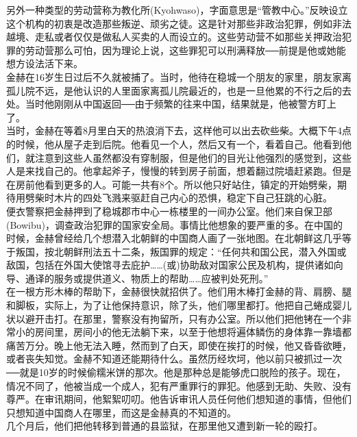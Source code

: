 另外一种类型的劳动营称为教化所(Kyohwaso)，字面意思是“管教中心。”反映设立这个机构的初衷是改造那些叛逆、顽劣之徒。这是针对那些非政治犯罪，例如非法越境、走私或者仅仅是做私人买卖的人而设立的。这些劳动营不如那些关押政治犯罪的劳动营那么可怕，因为理论上说，这些罪犯可以刑满释放──前提是他或她能想方设法活下来。\\

金赫在16岁生日过后不久就被捕了。当时，他待在稳城一个朋友的家里，朋友家离孤儿院不远，是他认识的人里面家离孤儿院最近的，也是一旦他累的不行之后的去处。当时他刚刚从中国返回──由于频繁的往来中国，结果就是，他被警方盯上了。\\

当时，金赫在等着8月里白天的热浪消下去，这样他可以出去砍些柴。大概下午4点的时候，他从屋子走到后院。他看见一个人，然后又有一个，看着自己。他看到他们，就注意到这些人虽然都没有穿制服，但是他们的目光让他强烈的感觉到，这些人是来找自己的。他拿起斧子，慢慢的转到房子前面，想着翻过院墙赶紧跑。但是在房前他看到更多的人。可能一共有8个。所以他只好站住，镇定的开始劈柴，期待用劈柴时木片的四处飞溅来驱赶自己内心的恐惧，稳定下自己狂跳的心脏。\\

便衣警察把金赫押到了稳城郡市中心一栋楼里的一间办公室。他们来自保卫部(Bowibu)，调查政治犯罪的国家安全局。事情比他想象的要严重的多。在中国的时候，金赫曾经给几个想潜入北朝鲜的中国商人画了一张地图。在北朝鲜这几乎等于叛国，按北朝鲜刑法五十二条，叛国罪的规定：“任何共和国公民，潜入外国或敌国，包括在外国大使馆寻去庇护……(或)协助敌对国家公民及机构，提供诸如向导、通译的服务或提供道义、物质上的帮助……应被判处死刑。”\\

在一根方形木棒的帮助下，金赫很快就招供了。他们用木棒打金赫的背、肩膀、腿和脚板，实际上，为了让他保持意识，除了头，他们哪里都打。他把自己蜷成婴儿状以避开击打。在那里，警察没有拘留所，只有办公室。所以他们把他铐在一个非常小的房间里，房间小的他无法躺下来，以至于他想将遍体鳞伤的身体靠一靠墙都痛苦万分。晚上他无法入睡，然而到了白天，即使在挨打的时候，他又昏昏欲睡，或者丧失知觉。金赫不知道还能期待什么。虽然历经坎坷，他以前只被抓过一次──就是10岁的时候偷糯米饼的那次。他是那种总是能够虎口脱险的孩子。现在，情况不同了，他被当成一个成人，犯有严重罪行的罪犯。他感到无助、失败、没有尊严。在审讯期间，他絮絮叨叨。他告诉审讯人员任何他们想知道的事情，但他们只想知道中国商人在哪里，而这是金赫真的不知道的。\\

几个月后，他们把他转移到普通的县监狱，在那里他又遭到新一轮的殴打。\\

